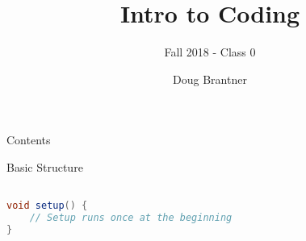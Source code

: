 \documentclass[pdf]{beamer}
\title{Intro to Coding}
\subtitle{Fall 2018 - Class 0}
\author{Doug Brantner}
\begin{document}

\begin{frame}
\titlepage
\end{frame}

\begin{frame}{Contents}
\tableofcontents
\end{frame}

\begin{frame}[fragile]{Basic Structure}
\begin{lstlisting}[language=Java]

void setup() {
    // Setup runs once at the beginning
}


\end{lstlisting}
\end{frame}
\end{document}

